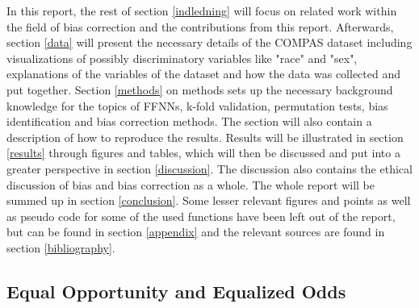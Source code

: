 \documentclass[11pt, fleqn, titlepage]{article}
\begin{document}
	\noindent In this report, the rest of section \ref{indledning} will focus on related work within the field of bias correction and the contributions from this report. Afterwards, section \ref{data} will present the necessary details of the COMPAS dataset including visualizations of possibly discriminatory variables like "race" and "sex", explanations of the variables of the dataset and how the data was collected and put together. Section \ref{methods} on methods sets up the necessary background knowledge for the topics of FFNNs, k-fold validation, permutation tests, bias identification and bias correction methods. The section will also contain a description of how to reproduce the results. Results will be illustrated in section \ref{results} through figures and tables, which will then be discussed and put into a greater perspective in section \ref{discussion}. The discussion also contains the ethical discussion of bias and bias correction as a whole. The whole report will be summed up in section \ref{conclusion}. Some lesser relevant figures and points as well as pseudo code for some of the used functions have been left out of the report, but can be found in section \ref{appendix} and the relevant sources are found in section \ref{bibliography}.
	
	\subsection{Equal Opportunity and Equalized Odds}\label{bias_def}
	
\end{document}
